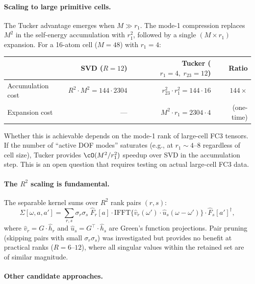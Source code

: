 \paragraph{Scaling to large primitive cells.}
The Tucker advantage emerges when $M \gg r_1$.  The mode-1
compression replaces $M^2$ in the self-energy accumulation with
$r_1^2$, followed by a single $(M \times r_1)$ expansion.  For a
16-atom cell ($M = 48$) with $r_1 = 4$:
\begin{center}
\begin{tabular}{lrrr}
  \toprule
  & SVD ($R = 12$) & Tucker ($r_1{=}4,\;r_{23}{=}12$) & Ratio \\
  \midrule
  Accumulation cost & $R^2 \cdot M^2 = 144 \cdot 2304$ & $r_{23}^2 \cdot r_1^2 = 144 \cdot 16$ & $144\times$ \\
  Expansion cost & --- & $M^2 \cdot r_1 = 2304 \cdot 4$ & (one-time) \\
  \bottomrule
\end{tabular}
\end{center}
Whether this is achievable depends on the mode-1 rank of large-cell
FC3 tensors.  If the number of ``active DOF modes'' saturates (e.g.,
at $r_1 \sim 4$--$8$ regardless of cell size), Tucker provides
$\cO(M^2/r_1^2)$ speedup over SVD in the accumulation step.
This is an open question that requires testing on actual large-cell
FC3 data.

\paragraph{The $R^2$ scaling is fundamental.}
The separable kernel sums over $R^2$ rank pairs $(r,s)$:
\begin{equation}
  \Sigma[\omega, a, a']
  = \sum_{r,s} \sigma_r \sigma_s\;
    \hat{F}_r[a] \cdot
    \mathrm{IFFT}\bigl\{\hat{v}_r(\omega') \cdot \hat{u}_s(\omega{-}\omega')\bigr\}
    \cdot \hat{F}_s[a']^\dagger,
\end{equation}
where $\hat{v}_r = G \cdot \hat{h}_r$ and $\hat{u}_s = G^\top \cdot \hat{h}_s$
are Green's function projections.  Pair pruning (skipping pairs with
small $\sigma_r \sigma_s$) was investigated but provides no benefit at
practical ranks ($R = 6$--$12$), where all singular values within the
retained set are of similar magnitude.

\paragraph{Other candidate approaches.}

